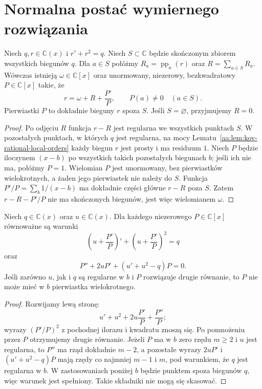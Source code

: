 \section{Normalna postać wymiernego rozwiązania}

\begin{lemat}
\label{aa:lem:kov-rational-normal-form}
Niech $q,r\in\mathbb C(x)$
i $r'+r^2=q$.
Niech $S\subset\mathbb C$
będzie skończonym zbiorem
wszystkich biegunów $q$.
Dla $a\in S$ połóżmy
$R_a=\operatorname{pp}_a(r)$
oraz $R=\sum_{a\in S}R_a$.
Wówczas istnieją
$\omega\in\mathbb C[x]$
oraz unormowany, niezerowy,
bezkwadratowy $P\in\mathbb C[x]$
takie, że
\begin{equation}\label{aa:eq:kov-rational-normal-r}
 r=\omega+R+\frac{P'}P,
 \qquad
 P(a)\ne0\quad(a\in S).
\end{equation}
Pierwiastki $P$ to dokładnie
bieguny $r$ spoza $S$.
Jeśli $S=\varnothing$, przyjmujemy $R=0$.
\end{lemat}
\begin{proof}
Po odjęciu $R$ funkcja
$r-R$ jest regularna
we wszystkich punktach $S$.
W pozostałych punktach,
w których $q$ jest regularna,
na mocy
Lematu~\ref{aa:lem:kov-rational-local-orders}
każdy biegun $r$ jest prosty
i ma residuum $1$.
Niech $P$ będzie iloczynem
$(x-b)$ po wszystkich takich
pozostałych biegunach $b$;
jeśli ich nie ma, połóżmy $P=1$.
Wielomian $P$ jest unormowany,
bez pierwiastków wielokrotnych,
a żaden jego pierwiastek
nie należy do $S$.
Funkcja $P'/P=\sum_b1/(x-b)$
ma dokładnie części główne
$r-R$ poza $S$.
Zatem $r-R-P'/P$
nie ma skończonych biegunów,
jest więc wielomianem $\omega$.
\end{proof}

\begin{stwierdzenie}
\label{aa:st:kov-rational-P-equation}
Niech $q\in\mathbb C(x)$
oraz $u\in\mathbb C(x)$.
Dla każdego niezerowego
$P\in\mathbb C[x]$
równoważne są warunki
\[
 \left(u+\frac{P'}P\right)'
 +\left(u+\frac{P'}P\right)^2=q
\]
oraz
\begin{equation}\label{aa:eq:kov-rational-P-ode}
 P''+2uP'+(u'+u^2-q)P=0.
\end{equation}
Jeśli zarówno $u$, jak i $q$
są regularne w $b$
i $P$ rozwiązuje drugie
równanie, to $P$ nie może
mieć w $b$ pierwiastka
wielokrotnego.
\end{stwierdzenie}
\begin{proof}
Rozwijamy lewą stronę:
\[
 u'+u^2+2u\frac{P'}P+\frac{P''}P;
\]
wyrazy $(P'/P)^2$
z pochodnej ilorazu
i kwadratu znoszą się.
Po pomnożeniu przez $P$
otrzymujemy drugie równanie.
Jeżeli $P$ ma w $b$ zero
rzędu $m\ge2$ i $u$ jest
regularna, to $P''$
ma rząd dokładnie $m-2$,
a pozostałe wyrazy
$2uP'$ i $(u'+u^2-q)P$
mają rzędy co najmniej
$m-1$ i $m$, pod warunkiem,
że $q$ jest regularna
w $b$. W zastosowaniach
poniżej $b$ będzie punktem
spoza biegunów $q$,
więc warunek jest spełniony.
Takie składniki nie mogą się
skasować.
\end{proof}

